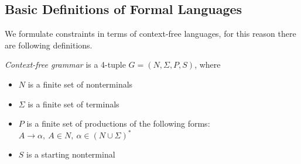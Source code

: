 \subsection{Basic Definitions of Formal Languages}
We formulate constraints in terms of context-free languages, for this reason there are following definitions.
\begin{definition}\emph{Context-free grammar} is a 4-tuple $G=(N, \Sigma, P, S)$, where 
\begin{itemize}
    \item $N$ is a finite set of nonterminals
    \item $\Sigma$ is a finite set of terminals
    \item $P$ is a finite set of productions of the following forms: $A \to \alpha, ~A \in N,~ \alpha \in (N \cup \Sigma)^*$
    \item $S$ is a starting nonterminal
\end{itemize}
\end{definition}


